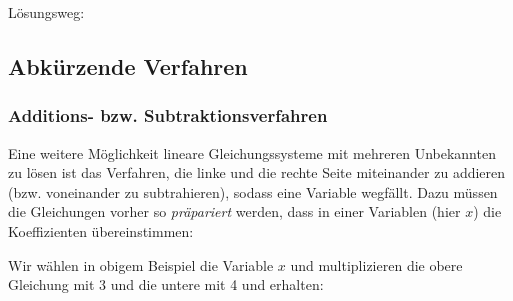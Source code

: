Lösungsweg:

  \newpage

\subsection{Abkürzende Verfahren}
\subsubsection{Additions- bzw. Subtraktionsverfahren}
Eine weitere Möglichkeit lineare Gleichungssysteme mit mehreren Unbekannten zu lösen ist das Verfahren, die linke und die rechte Seite miteinander zu addieren (bzw. voneinander zu subtrahieren), sodass eine Variable wegfällt. Dazu müssen die Gleichungen vorher so \textit{präpariert} werden, dass in einer Variablen (hier \zB $x$) die Koeffizienten übereinstimmen:


Wir wählen \zB in obigem Beispiel die Variable $x$ und multiplizieren die obere Gleichung mit 3 und die untere mit 4 und
erhalten:




